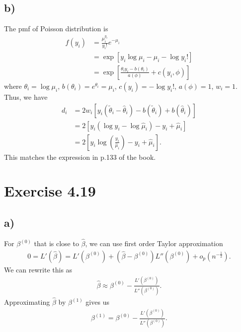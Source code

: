 \documentclass[a4paper]{article}
\begin{document}
\subsection{b)}
The pmf of Poisson distribution is
\begin{align*}
f(y_{i}) &= \frac{\mu_{i}^{y_{i}}}{y_{i}!}e^{-\mu_{i}}\\
&= \exp\left[y_{i}\log\mu_{i} -\mu_{i} -\log y_{i}!\right]\\
&= \exp\left[\frac{\theta_{i}y_{i} -b(\theta_{i})}{a(\phi)} + c(y_{i},\phi)\right]
\end{align*}
where $\theta_{i} = \log\mu_{i}$, $b(\theta_{i}) = e^{\theta_{i}} = \mu_{i}$, $c(y_{i}) = -\log y_{i}!$, $a(\phi) = 1$, $w_{i} = 1$.\\
Thus, we have
\begin{align*}
d_{i} &= 2w_{i}\left[y_{i}\left(\widetilde{\theta}_{i} - \widehat{\theta}_{i}\right) -b\left(\widetilde{\theta}_{i}\right) + b\left(\widehat{\theta}_{i}\right)\right]\\
&= 2\left[y_{i}\left(\log y_{i} -\log\widehat{\mu}_{i}\right) -y_{i} +\widehat{\mu}_{i}\right]\\
&= 2\left[y_{i}\log\left(\frac{y_{i}}{\widehat{\mu}_{i}}\right) -y_{i} +\widehat{\mu}_{i}\right].
\end{align*}
This matches the expression in p.133 of the book.


\vspace{\baselineskip}
\section{Exercise 4.19}
\subsection{a)}
For $\beta^{(0)}$ that is close to $\widehat{\beta}$, we can use first order Taylor approximation
\begin{align*}
0 = L'(\widehat{\beta}) = L'(\beta^{(0)}) + \left(\widehat{\beta}-\beta^{(0)}\right)L''(\beta^{(0)}) + o_p (n^{-\frac{1}{2}}).
\end{align*}
We can rewrite this as
\begin{align*}
\widehat{\beta} \approx \beta^{(0)} - \frac{L'(\beta^{(0)})}{L''(\beta^{(0)})}.
\end{align*}
Approximating $\widehat{\beta}$ by $\beta^{(1)}$ gives us
\begin{align*}
\beta^{(1)} = \beta^{(0)} - \frac{L'(\beta^{(0)})}{L''(\beta^{(0)})}.
\end{align*}
\end{document}

